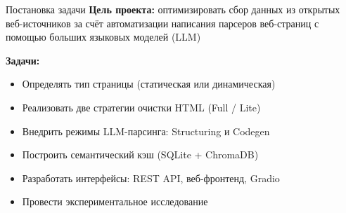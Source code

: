 \documentclass
  [ russian
  , aspectratio=1610 %
  ] {beamer}
\begin{document}
\begin{frame}{Постановка задачи}
    \textbf{Цель проекта:} оптимизировать сбор данных из открытых веб-источников за счёт автоматизации написания парсеров веб-страниц с помощью больших языковых моделей (LLM)

    \vspace{1em}
    \textbf{Задачи:}
    \begin{itemize}
        \item Определять тип страницы (статическая или динамическая)
        \item Реализовать две стратегии очистки HTML (Full / Lite)
        \item Внедрить режимы LLM-парсинга: Structuring и Codegen
        \item Построить семантический кэш (SQLite + ChromaDB)
        \item Разработать интерфейсы: REST API, веб-фронтенд, Gradio
        \item Провести экспериментальное исследование
    \end{itemize}
\end{frame}
\end{document}
